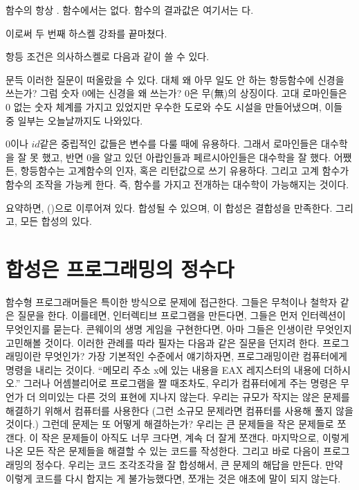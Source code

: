 함수의 \trFunctionBody\는 항상 . 함수에서는  없다. 
함수의 결과값은  여기서는 다.

이로써 두 번째 하스켈 강좌를 끝마쳤다.

항등 조건은 의사하스켈로 다음과 같이 쓸 수 있다.

문득 이러한 질문이 떠올랐을 수 있다. 대체 왜 아무 일도 안 하는 항등함수에 신경을 쓰는가?
그럼 숫자 0에는 신경을 왜 쓰는가? 0은 무(無)의 상징이다. 고대 로마인들은 0 없는 숫자 체계를 가지고 있었지만
우수한 도로와 수도 시설을 만들어냈으며, 이들 중 일부는 오늘날까지도 나와있다.

0이나 $id$같은 중립적인 값들은 \trSymbolic 변수를 다룰 때에 유용하다.
그래서 로마인들은 대수학을 잘 못 했고, 반면 0을 알고 있던 아랍인들과 페르시아인들은 대수학을 잘 했다.
어쨌든, 항등함수는 고계함수의 인자, 혹은 리턴값으로 쓰기 유용하다. 
그리고 고계 함수가 함수의  조작을 가능케 한다.
즉, 함수를 가지고 전개하는 대수학이 가능해지는 것이다.

요약하면,   \trArrow(\trMorphism)으로 이루어져 있다.
 합성될 수 있으며, 이 합성은 결합성을 만족한다.
그리고, 모든  합성의  \trIdentity {} 있다.

\section{합성은 프로그래밍의 정수다}

함수형 프로그래머들은 특이한 방식으로 문제에 접근한다. 그들은 무척이나 철학자 같은 질문을 한다.
이를테면, 인터렉티브 프로그램을 만든다면, 그들은 먼저 인터렉션이 무엇인지를 묻는다.
콘웨이의 생명 게임을 구현한다면, 아마 그들은 인생이란 무엇인지 고민해볼 것이다.
이러한 관례를 따라 필자는 다음과 같은 질문을 던지려 한다. 프로그래밍이란 무엇인가?
가장 기본적인 수준에서 얘기하자면, 프로그래밍이란 컴퓨터에게 명령을 내리는 것이다.
``메모리 주소 x에 있는 내용을 EAX 레지스터의 내용에 더하시오.'' 
그러나 어셈블리어로 프로그램을 짤 때조차도, 우리가 컴퓨터에게 주는 명령은 무언가 더 의미있는 다른 것의 표현에 지나지 않는다.
우리는 규모가 작지는 않은 문제를 해결하기 위해서 컴퓨터를 사용한다 (그런 소규모 문제라면 컴퓨터를 사용해 풀지 않을 것이다.)
그런데 문제는 또 어떻게 해결하는가? 우리는 큰 문제들을 작은 문제들로 쪼갠다. 
이 작은 문제들이 아직도 너무 크다면, 계속 더 잘게 쪼갠다.
마지막으로, 이렇게 나온 모든 작은 문제들을 해결할 수 있는 코드를 작성한다.
그리고 바로 다음이 프로그래밍의 정수다.
우리는 코드 조각조각을 잘 합성해서, 큰 문제의 해답을 만든다. 
만약 이렇게 코드를 다시 합지는 게 불가능했다면, 쪼개는 것은 애초에 말이 되지 않는다.

